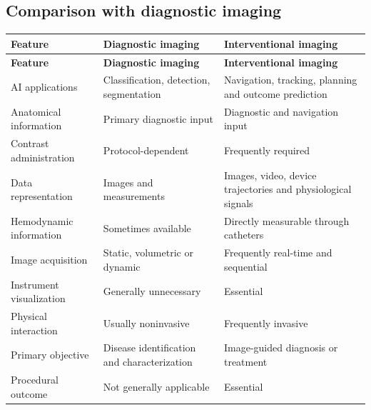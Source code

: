 \subsection{Comparison with diagnostic imaging}
\begin{longtable}{@{}p{}p{}p{}@{}}
\toprule
\textbf{Feature} & \textbf{Diagnostic imaging} & \textbf{Interventional imaging} \\
\midrule
\endfirsthead
\toprule
\textbf{Feature} & \textbf{Diagnostic imaging} & \textbf{Interventional imaging} \\
\midrule
\endhead
AI applications & Classification, detection, segmentation & Navigation, tracking, planning and outcome prediction \\
Anatomical information & Primary diagnostic input & Diagnostic and navigation input \\
Contrast administration & Protocol-dependent & Frequently required \\
Data representation & Images and measurements & Images, video, device trajectories and physiological signals \\
Hemodynamic information & Sometimes available & Directly measurable through catheters \\
Image acquisition & Static, volumetric or dynamic & Frequently real-time and sequential \\
Instrument visualization & Generally unnecessary & Essential \\
Physical interaction & Usually noninvasive & Frequently invasive \\
Primary objective & Disease identification and characterization & Image-guided diagnosis or treatment \\
Procedural outcome & Not generally applicable & Essential \\
\bottomrule
\end{longtable}

